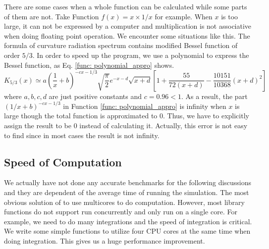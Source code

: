 \documentclass[12pt]{report}
\begin{document}
          There are some cases when a whole function can be calculated while some parts of them are not. 
          Take Function $f\left(x\right) = x\times1/x$ for example. When $x$ is too large, it 
          can not be expressed by a computer and multiplication is not associative when doing floating 
          point operation. We encounter some situations like this.
          The formula of curvature radiation spectrum contains modified Bessel function of order $5/3$.
          In order to speed up the program, we use a polynomial to express the Bessel function, as
          Eq. \ref{func: polynomial_appro} shows. 
          \begin{equation}
            K_{5/3} \left(x\right) \simeq a \left(\frac{1}{x} + b\right)^{-cx - 1/3} \sqrt{\frac{\pi}{2}} e^{-x - d} \sqrt{x + d} %
            \left[1 + \frac{55}{72\left(x + d\right)} - \frac{10151}{10368}\left(x+d\right)^2\right] 
            \label{func: polynomial_appro}
          \end{equation}
          where $a,b,c,d$ are just positive constants and $c = 0.96 < 1$. As a result, 
          the part $(1/x + b)^{-cx - 1/3}$ in Function \ref{func: polynomial_appro} is infinity
          when $x$ is large though the total function is approximated to $0$. Thus, we have to explicitly 
          assign the result to be $0$ instead of calculating it. Actually, this error is not easy to find 
          since in most cases the result is not infinity. 
          
        \subsection{Speed of Computation}
          We actually have not done any accurate benchmarks for the following discussions and they are 
          dependent of the average time of running the simulation.
          The most obvious solution of to use multicores to do computation. However, most library functions 
          do not support run concurrently and only run on a single core. For example, we need to do many 
          integrations and the speed of integration is critical. We write some simple functions to 
          utilize four CPU cores at the same time when doing integration. 
          This gives us a huge performance improvement.
\end{document}
